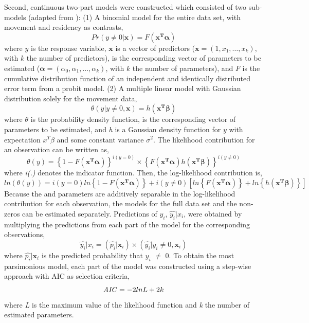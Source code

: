 \documentclass[preprint,12pt,authoryear]{elsarticle}
\begin{document}
Second, continuous two-part models were constructed which consisted of two sub-models (adapted from \cite{Belotti2015Twopm:Models}): (1) A binomial model for the entire data set, with movement and residency as contrasts, 
\begin{equation}
\label{eq:BinMODEL}
Pr(y\neq 0|\mathbf{x})=F(\mathbf{x^T}\bm{\alpha})
\end{equation}
where $y$ is the response variable, $\textbf{x}$ is a vector of predictors ($\textbf{x}=(1,x_1,\ldots, x_k)$, with $k$ the number of predictors), \bm{$\alpha$} is the corresponding vector of parameters to be estimated ($\bm{\alpha} = (\alpha_0,\alpha_1,\ldots ,\alpha_k)$, with $k$ the number of parameters), and $\textit{F}$ is the cumulative distribution function of an independent and identically distributed error term from a probit model. (2) A multiple linear model with Gaussian distribution solely for the movement data,
\begin{equation}
\label{eq:LinMODEL}
\theta(y|y\neq 0,\mathbf{x})=h(\mathbf{x^T}\bm{\beta})
\end{equation}
where $\theta$ is the probability density function, \bm{$\beta$} is the corresponding vector of parameters to be estimated, and \textit{h} is a Gaussian density function for $y$ with expectation $x^T\beta$ and some constant variance $\sigma^2$. The likelihood contribution for an observation can be written as,
\begin{equation}
\label{eq:LIKELIHOOD}
\theta(y)=\left \{ 1-F(\mathbf{x^T}\bm{\alpha}) \right \}^{i(y=0)}\times \left \{ F(\mathbf{x^T}\bm{\alpha} )h(\mathbf{x^T}\bm{\beta} ) \right \}^{i(y\neq 0)}
\end{equation}
where \textit{i(.)} denotes the indicator function. Then, the log-likelihood contribution is,
\begin{equation}
\label{eq:LOGLIKELIHOOD}
ln(\theta(y))=i(y=0)ln \left \{ 1-F(\mathbf{x^T}\bm{\alpha}) \right \}+ i(y \neq 0)[ln \left \{ F(\mathbf{x^T}\bm{\alpha}) \right \}+ln \left \{h(\mathbf{x^T}\bm{\beta}) \right \}]
\end{equation}
Because the \bm{$\alpha$} and \bm{$\beta$} parameters are additively separable in the log-likelihood contribution for each observation, the models for the full data set and the non-zeros can be estimated separately. Predictions of \textit{$y_{i}$}, $\widehat{y_{i}}|x_{i}$, were obtained by multiplying the predictions from each part of the model for the corresponding observations,
\begin{equation}
\label{eq:PREDICTION}
\widehat{y_{i}}|x_{i}=(\widehat{p_{i}}|\mathbf{x}_{i})\times (\widehat{y_{i}}|y_{i}\neq 0,\mathbf{x}_{i})
\end{equation}
where $\widehat{p_{i}}|\mathbf{x}_{i}$ is the predicted probability that \textit{$y_{i}$} $\neq$ 0. To obtain the most parsimonious model, each part of the model was constructed using a step-wise approach with AIC as selection criteria, 
\begin{equation}
\label{eq:AIC}
\textrm{\textit{AIC}}=-2lnL+2k
\end{equation}
where \textit{L} is the maximum value of the likelihood function and \textit{k} the number of estimated parameters. 
\end{document}

